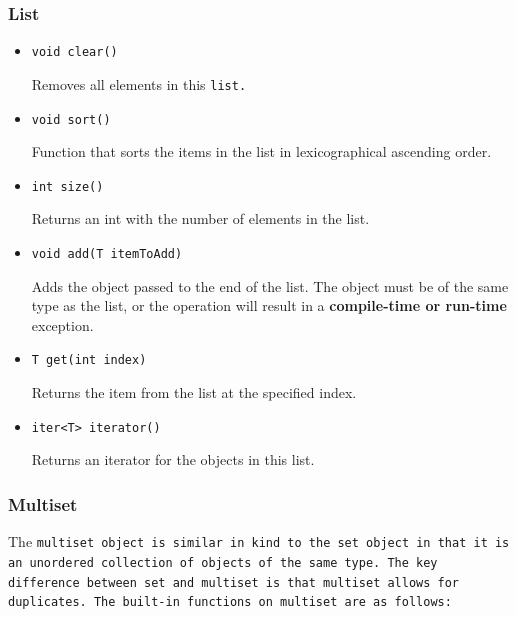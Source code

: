 \documentclass{article}
\begin{document}

\subsubsection{List} %
\label{ssub:list}

\begin{itemize}
  
\item[] \tt void clear() \rm

Removes all elements in this \tt list\rm.

\item[] \tt void sort() \rm

Function that sorts the items in the list in lexicographical ascending order.

\item[] \tt int size() \rm

Returns an int with the number of elements in the list.

\item[] \tt void add(T itemToAdd) \rm

Adds the object passed to the end of the list. The object must be of the same
type as the list, or the operation will result in a \textbf{compile-time or
run-time} exception.

\item[] \tt T get(int index) \rm

Returns the item from the list at the specified index.

\item[] \tt iter<T> iterator() \rm

Returns an iterator for the objects in this list.

\end{itemize}



\subsubsection{Multiset} %
\label{ssub:multiset}

The \tt multiset \rm object is similar in kind to the \tt set \rm object in that
it is an unordered collection of objects of the same type. The key difference
between \tt set \rm and \tt multiset \rm is that \tt multiset \rm allows for
duplicates. The built-in functions on \tt multiset \rm are as follows:
\end{document}
